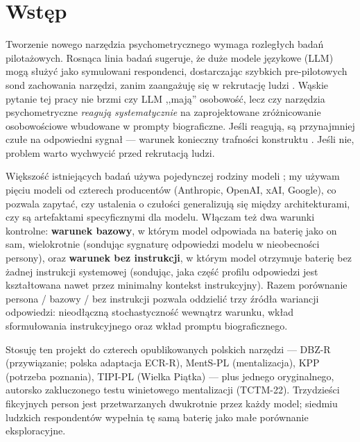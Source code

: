\documentclass[11pt,a4paper]{article}
\begin{document}
\begin{abstract}
Otwarte dane, biografie i skrypty analityczne są udostępnione na licencji CC BY 4.0; każde liczbowe twierdzenie w tej pracy jest reprodukowalne z wydanego pliku CSV.

\vspace{4pt}\noindent\textbf{Słowa kluczowe:} respondenci syntetyczni, czułość narzędzi, mentalizacja, przywiązanie, porównanie LLM między producentami, sygnatura bazowa odpowiedzi
\end{abstract}

\section{Wstęp}

Tworzenie nowego narzędzia psychometrycznego wymaga rozległych badań pilotażowych. Rosnąca linia badań sugeruje, że duże modele językowe (LLM) mogą służyć jako symulowani respondenci, dostarczając szybkich pre-pilotowych sond zachowania narzędzi, zanim zaangażuję się w rekrutację ludzi \cite{argyle2023,dillion2023}. Wąskie pytanie tej pracy nie brzmi czy LLM ,,mają'' osobowość, lecz czy narzędzia psychometryczne \emph{reagują systematycznie} na zaprojektowane zróżnicowanie osobowościowe wbudowane w prompty biograficzne. Jeśli reagują, są przynajmniej czułe na odpowiedni sygnał --- warunek konieczny trafności konstruktu \cite{cronbach1955}. Jeśli nie, problem warto wychwycić przed rekrutacją ludzi.

Większość istniejących badań używa pojedynczej rodziny modeli \cite{argyle2023,dillion2023}; my używam pięciu modeli od czterech producentów (Anthropic, OpenAI, xAI, Google), co pozwala zapytać, czy ustalenia o czułości generalizują się między architekturami, czy są artefaktami specyficznymi dla modelu. Włączam też dwa warunki kontrolne: \textbf{warunek bazowy}, w którym model odpowiada na baterię jako on sam, wielokrotnie (sondując sygnaturę odpowiedzi modelu w nieobecności persony), oraz \textbf{warunek bez instrukcji}, w którym model otrzymuje baterię bez żadnej instrukcji systemowej (sondując, jaka część profilu odpowiedzi jest kształtowana nawet przez minimalny kontekst instrukcyjny). Razem porównanie persona / bazowy / bez instrukcji pozwala oddzielić trzy źródła wariancji odpowiedzi: nieodłączną stochastyczność wewnątrz warunku, wkład sformułowania instrukcyjnego oraz wkład promptu biograficznego.

Stosuję ten projekt do czterech opublikowanych polskich narzędzi --- DBZ-R (przywiązanie; polska adaptacja ECR-R), MentS-PL (mentalizacja), KPP (potrzeba poznania), TIPI-PL (Wielka Piątka) --- plus jednego oryginalnego, autorsko zakluczonego testu winietowego mentalizacji (TCTM-22). Trzydzieści fikcyjnych person jest przetwarzanych dwukrotnie przez każdy model; siedmiu ludzkich respondentów wypełnia tę samą baterię jako małe porównanie eksploracyjne.
\end{document}
